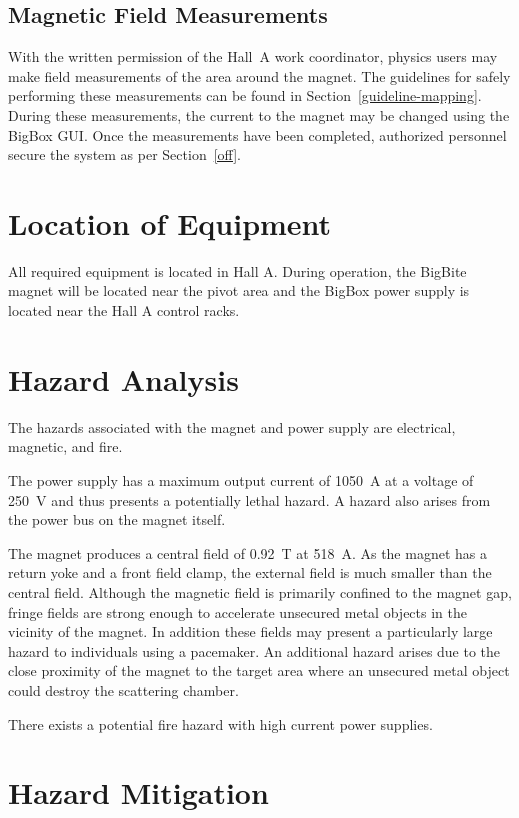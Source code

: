 \subsection{Magnetic Field Measurements}

With the written permission of the Hall~A work coordinator, physics users may make field measurements of the
area around the magnet.
The guidelines for safely performing these
measurements can be found in Section~\ref{guideline-mapping}.  
During these measurements, the current to the magnet may be changed using the BigBox GUI.
Once the measurements have been completed, authorized personnel secure the system 
as per Section~\ref{off}.

\section{Location of Equipment}

All required equipment is located in Hall A.  During operation, the BigBite magnet 
will be located near the pivot area and the BigBox power supply is
located near the Hall A control racks.

\section{Hazard Analysis}

The hazards associated with the magnet and power supply are electrical, magnetic, and fire.

	The power supply has a maximum output current of 1050~A 
at a voltage of 250~V and thus presents a potentially lethal hazard.  
A hazard also arises from the power bus on the magnet itself. 

	The magnet produces a central field of 0.92~T at 518~A.  
As the magnet has a return yoke and a front field clamp, the external field is much smaller 
than the central field.   Although the magnetic field is primarily confined to the magnet 
gap, fringe fields are strong enough to accelerate unsecured metal objects in the vicinity of
the magnet.  In addition these fields may present a particularly large hazard 
to individuals using a pacemaker.
An additional hazard arises due to the close proximity of the magnet to the target area where
an unsecured metal object could destroy the scattering chamber.

  There exists a potential fire hazard with high current power supplies.  
\section{Hazard Mitigation}

